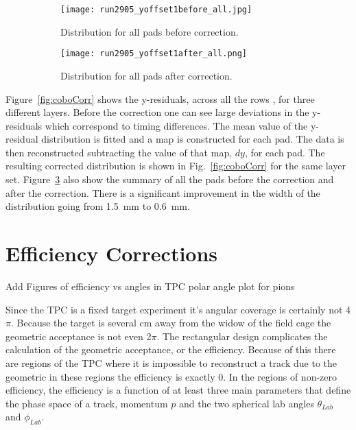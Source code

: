 \begin{figure}[!htb]
    \begin{subfigure}[t]{.49\textwidth}
        \centering
        \texttt{[image: run2905\_yoffset1before\_all.jpg]} 
        \caption{Distribution for all pads before correction.} \label{fig:yoff_allBefore}
    \end{subfigure}
    \hfill
    \begin{subfigure}[t]{.49\textwidth}
        \centering
        \texttt{[image: run2905\_yoffset1after\_all.png]}
        \caption{Distribution for all pads after correction.} \label{fig:yoff_allAfter}
    \end{subfigure}
    \caption{ }
\label{fig:yoff}
\end{figure}


 Figure~\ref{fig:coboCorr} shows the y-residuals, across all the rows , for three different layers. Before the correction one can see large deviations in the y-residuals which correspond to timing differences. The mean value of the y-residual distribution is fitted and a map is constructed for each pad. The data is then reconstructed subtracting the value of that map, $dy$, for each pad. The resulting corrected distribution is shown in Fig.~\ref{fig:coboCorr} for the same layer set. Figure~\ref{fig:yoff} also show the summary of all the pads before the correction and after the correction. There is a significant improvement in the width of the distribution going from \SI{1.5}{\milli\metre} to \SI{0.6}{\milli\metre}. 


\section{Efficiency Corrections}
\label{sec:efficiency}
Add Figures of efficiency vs angles in TPC polar angle plot for pions


Since the \spirit TPC is a fixed target experiment it's angular coverage is certainly not 4$\pi$. Because the target is several cm away from the widow of the field cage the geometric acceptance is not even 2$\pi$. The rectangular design complicates the calculation of the geometric acceptance, or the efficiency. Because of this there are regions of the TPC where it is impossible to reconstruct a track due to the geometric in these regions the efficiency is exactly 0. In the regions of non-zero efficiency, the efficiency is a function of at least three main parameters that define the phase space of a track, momentum $p$ and the two spherical lab angles $\theta_{Lab}$ and $\phi_{Lab}$. 

